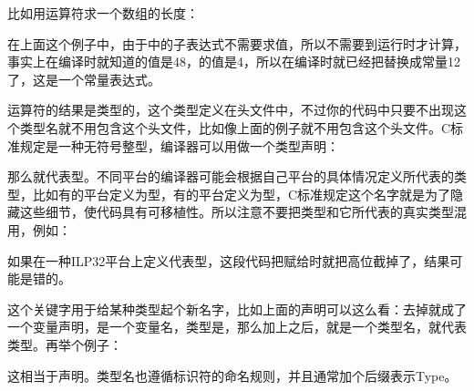 比如用运算符求一个数组的长度：




在上面这个例子中，由于中的子表达式不需要求值，所以不需要到运行时才计算，事实上在编译时就知道的值是48，的值是4，所以在编译时就已经把替换成常量12了，这是一个常量表达式。



运算符的结果是类型的，这个类型定义在头文件中，不过你的代码中只要不出现这个类型名就不用包含这个头文件，比如像上面的例子就不用包含这个头文件。C标准规定是一种无符号整型，编译器可以用做一个类型声明：




那么就代表型。不同平台的编译器可能会根据自己平台的具体情况定义所代表的类型，比如有的平台定义为型，有的平台定义为型，C标准规定这个名字就是为了隐藏这些细节，使代码具有可移植性。所以注意不要把类型和它所代表的真实类型混用，例如：




如果在一种ILP32平台上定义代表型，这段代码把赋给时就把高位截掉了，结果可能是错的。



这个关键字用于给某种类型起个新名字，比如上面的声明可以这么看：去掉就成了一个变量声明，是一个变量名，类型是，那么加上之后，就是一个类型名，就代表类型。再举个例子：




这相当于声明。类型名也遵循标识符的命名规则，并且通常加个后缀表示Type。

